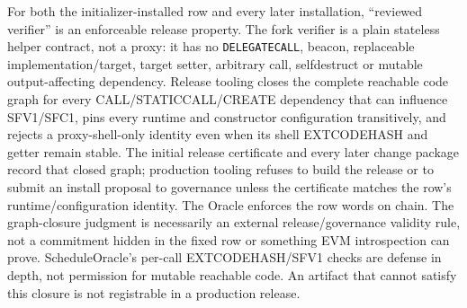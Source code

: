 \documentclass[a4paper,11pt]{article}
\newcommand{\code}[1]{\nolinkurl{#1}}
\begin{document}
For both the initializer-installed row and every later installation,
``reviewed verifier'' is an enforceable release property.  The fork verifier
is a plain stateless helper contract, not a proxy: it has no
\code{DELEGATECALL}, beacon, replaceable implementation/target, target setter,
arbitrary call, selfdestruct or mutable output-affecting dependency.  Release
tooling closes the complete reachable code graph for every
CALL/STATICCALL/CREATE dependency that can influence SFV1/SFC1, pins every
runtime and constructor configuration transitively, and rejects a
proxy-shell-only identity even when its shell EXTCODEHASH and getter remain
stable.  The initial release certificate and every later change package record
that closed graph; production tooling refuses to build the release or to
submit an install proposal to governance unless the certificate matches the
row's runtime/configuration identity.  The Oracle enforces the row words on
chain.  The graph-closure judgment is necessarily an external
release/governance validity rule, not a commitment hidden in the fixed row or
something EVM introspection can prove.  ScheduleOracle's per-call
EXTCODEHASH/SFV1 checks are defense in depth, not permission for mutable
reachable code.  An artifact that cannot satisfy this closure is not
registrable in a production release.
\end{document}
